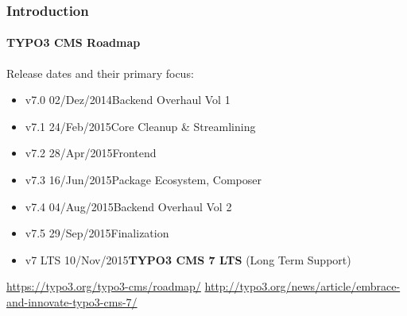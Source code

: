\begin{frame}[fragile]
	\frametitle{Introduction}
	\framesubtitle{TYPO3 CMS Roadmap}

	Release dates and their primary focus:

	\begin{itemize}
		\item v7.0 \tabto{1.1cm}02/Dez/2014\tabto{3.4cm}Backend Overhaul Vol 1
		\item v7.1 \tabto{1.1cm}24/Feb/2015\tabto{3.4cm}Core Cleanup \& Streamlining
		\item v7.2 \tabto{1.1cm}28/Apr/2015\tabto{3.4cm}Frontend
		\item v7.3 \tabto{1.1cm}16/Jun/2015\tabto{3.4cm}Package Ecosystem, Composer
		\item v7.4 \tabto{1.1cm}04/Aug/2015\tabto{3.4cm}Backend Overhaul Vol 2
		\item v7.5 \tabto{1.1cm}29/Sep/2015\tabto{3.4cm}Finalization

		\item
			\begingroup
				\color{typo3orange}
					v7 LTS \tabto{1.1cm}10/Nov/2015\tabto{3.4cm}\textbf{TYPO3 CMS 7 LTS} (Long Term Support)
			\endgroup

	\end{itemize}

	\smaller
		\url{https://typo3.org/typo3-cms/roadmap/}\newline
		\url{http://typo3.org/news/article/embrace-and-innovate-typo3-cms-7/}
	\normalsize

\end{frame}

